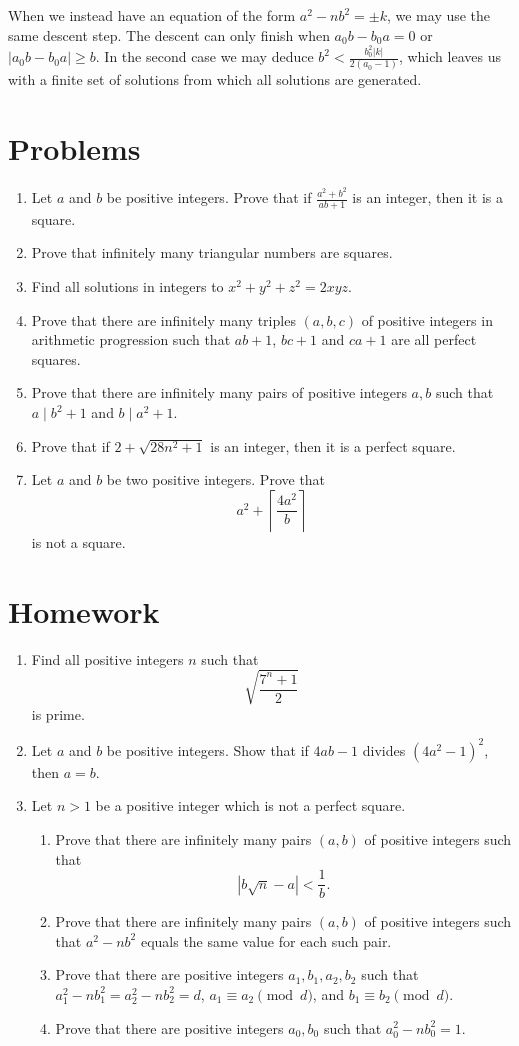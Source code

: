 \documentclass{article}
\begin{document}
When we instead have an equation of the form $a^2-nb^2=\pm k$, we may use the
same descent step. The descent
can only finish when $a_0 b-b_0 a=0$ or $|a_0 b-b_0 a|\ge b$. In the second case 
we may deduce
$b^2<\frac{b_0^2|k|}{2(a_0-1)}$,
which leaves us with a finite set of solutions from which all solutions are
generated.
\newpage
\section{Problems}
\begin{enumerate}
  \item Let $a$ and $b$ be positive integers.
    Prove that if \(\frac{a^2+b^2}{ab+1}\) is an integer, then it is a square.
  \item Prove that infinitely many triangular numbers are squares.
  \item Find all solutions in integers to $x^2+y^2+z^2=2xyz$.
  \item Prove that there are infinitely many triples $(a,b,c)$ of positive
    integers in arithmetic progression
    such that $ab+1$, $bc+1$ and $ca+1$ are all perfect squares.
  \item Prove that there are infinitely many pairs of positive integers $a,b$
    such that $a\mid b^2+1$ and $b\mid a^2+1$.
\item Prove that if $2+\sqrt{28n^2+1}$ is an integer, then it is a perfect
    square.
  \item Let $a$ and $b$ be two positive integers. Prove that
    \[a^2+\left\lceil\frac{4a^2}b\right\rceil\] is not a square.
\end{enumerate}
\newpage
\section{Homework}
  \begin{enumerate}
    \item Find all positive integers $n$ such that \[\sqrt{\frac{7^n+1}2}\] is
      prime.
    \item Let $a$ and $b$ be positive integers. Show that if $4ab-1$ divides
      $(4a^2-1)^2$, then $a=b$.
    \item Let $n>1$ be a positive integer which is not a perfect square.
    \begin{enumerate}
        \item Prove that there are infinitely many pairs $(a,b)$ of positive
            integers such that
            \[\left|b\sqrt n-a\right|<\frac 1b.\]
        \item Prove that there are infinitely many pairs $(a,b)$ of positive
            integers such that $a^2-nb^2$ equals the same value for each such pair.
        \item Prove that there are positive integers $a_1,b_1,a_2,b_2$
            such that $a_1^2-nb_1^2=a_2^2-nb_2^2=d$, $a_1\equiv a_2\pmod d$, and
            $b_1\equiv b_2\pmod d$.
        \item Prove that there are positive integers $a_0,b_0$ such that
            $a_0^2-nb_0^2=1$.
    \end{enumerate}
\end{enumerate}
\end{document}
